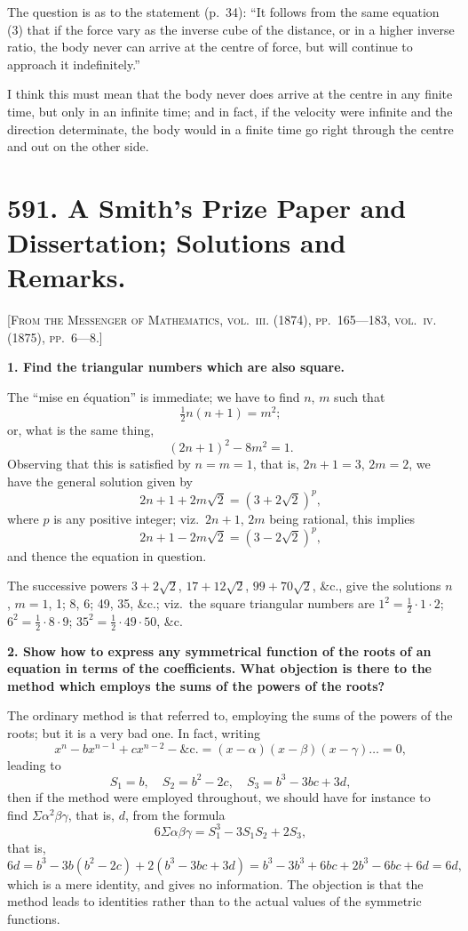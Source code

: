 \documentclass[11pt,a4paper]{article}
\theoremstyle{plain}
\theoremstyle{definition}
\theoremstyle{remark}
\begin{document}
The question is as to the statement (p.~34): ``It follows from the same equation (3) that if the force vary as the inverse cube of the distance, or in a higher inverse ratio, the body never can arrive at the centre of force, but will continue to approach it indefinitely.''

I think this must mean that the body never does arrive at the centre in any finite time, but only in an infinite time; and in fact, if the velocity were infinite and the direction determinate, the body would in a finite time go right through the centre and out on the other side.

\newpage

\section*{591. A Smith's Prize Paper and Dissertation; Solutions and Remarks.}

\noindent\textsc{[From the Messenger of Mathematics, vol.~\textsc{iii}. (1874), pp.~165---183, vol.~\textsc{iv}. (1875), pp.~6---8.]}

\medskip

\noindent\textbf{1. Find the triangular numbers which are also square.}

The ``mise en \'{e}quation'' is immediate; we have to find $n$, $m$ such that
\[
\tfrac{1}{2}n(n+1) = m^2;
\]
or, what is the same thing,
\[
(2n+1)^2 - 8m^2 = 1.
\]
Observing that this is satisfied by $n = m = 1$, that is, $2n + 1 = 3$, $2m = 2$, we have the general solution given by
\[
2n + 1 + 2m\surd 2 = (3 + 2\surd 2)^p,
\]
where $p$ is any positive integer; viz.\ $2n+1$, $2m$ being rational, this implies
\[
2n + 1 - 2m\surd 2 = (3 - 2\surd 2)^p,
\]
and thence the equation in question.

The successive powers $3 + 2\surd 2$, $17 + 12\surd 2$, $99 + 70\surd 2$, \&c., give the solutions $n$, $m = 1$, 1; 8, 6; 49, 35, \&c.; viz.\ the square triangular numbers are $1^2 = \tfrac{1}{2} \cdot 1 \cdot 2$; $6^2 = \tfrac{1}{2} \cdot 8 \cdot 9$; $35^2 = \tfrac{1}{2} \cdot 49 \cdot 50$, \&c.

\smallskip

\noindent\textbf{2. Show how to express any symmetrical function of the roots of an equation in terms of the coefficients. What objection is there to the method which employs the sums of the powers of the roots?}

The ordinary method is that referred to, employing the sums of the powers of the roots; but it is a very bad one. In fact, writing
\[
x^n - bx^{n-1} + cx^{n-2} - \&\mathrm{c}. = (x - \alpha)(x - \beta)(x - \gamma) \ldots = 0,
\]
leading to
\[
S_1 = b,\quad S_2 = b^2 - 2c,\quad S_3 = b^3 - 3bc + 3d,
\]
then if the method were employed throughout, we should have for instance to find $\Sigma\alpha^2\beta\gamma$, that is, $d$, from the formula
\[
6\Sigma\alpha\beta\gamma = S_1^3 - 3S_1S_2 + 2S_3,
\]
that is,
\[
6d = b^3 - 3b(b^2 - 2c) + 2(b^3 - 3bc + 3d) = b^3 - 3b^3 + 6bc + 2b^3 - 6bc + 6d = 6d,
\]
which is a mere identity, and gives no information. The objection is that the method leads to identities rather than to the actual values of the symmetric functions.
\end{document}
